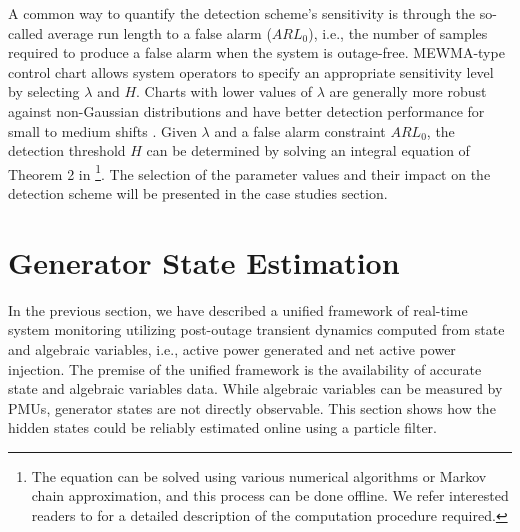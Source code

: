 A common way to quantify the detection scheme's sensitivity is through the so-called average run length to a false alarm ($ARL_0$), i.e., the number of samples required to produce a false alarm when the system is outage-free. MEWMA-type control chart allows system operators to specify an appropriate sensitivity level by selecting $\lambda$ and $H$. Charts with lower values of $\lambda$ are generally more robust against non-Gaussian distributions and have better detection performance for small to medium shifts \cite{montgomery2007introduction}. Given $\lambda$ and a false alarm constraint $ARL_0$, the detection threshold $H$ can be determined by solving an integral equation of Theorem 2 in \cite{rigdon1995integral}\footnote{The equation can be solved using various numerical algorithms or Markov chain approximation, and this process can be done offline. We refer interested readers to \cite{knoth2017arl} for a detailed description of the computation procedure required.}. The selection of the parameter values and their impact on the detection scheme will be presented in the case studies section. 



\section{Generator State Estimation}
\label{sec:state_estimation}
In the previous section, we have described a unified framework of real-time system monitoring utilizing post-outage transient dynamics computed from state and algebraic variables, i.e., active power generated and net active power injection. The premise of the unified framework is the availability of accurate state and algebraic variables data. While algebraic variables can be measured by PMUs, generator states are not directly observable. This section shows how the hidden states could be reliably estimated online using a particle filter.

